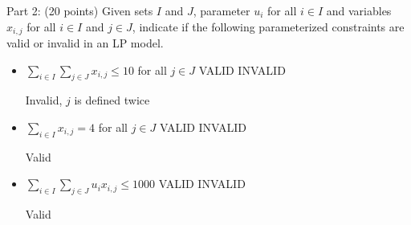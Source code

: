 \documentclass[letterpaper,oneside,12pt]{article}%
\newcommand{\blu}{\color{blue}}
\begin{document}
\vfill

Part 2: (20 points) Given sets $I$ and $J$, parameter $u_i$ for all $i \in I$ and variables $x_{i,j}$ for all $i \in I$ and $j \in J$, indicate if the following parameterized constraints are valid or invalid in an LP model.
\begin{itemize}
\item $ \sum\limits_{i \in I} \sum\limits_{j \in J} x_{i,j} \leq 10$ for all $j \in J$ \hfill VALID \hspace{1mm} INVALID \hspace{50mm} \phantom{a}

{\blu
Invalid, $j$ is defined twice
}

\item $ \sum\limits_{i \in I} x_{i,j} = 4$ for all $j \in J$ \hfill VALID \hspace{1mm} INVALID  \hspace{50mm} \phantom{a}

{\blu
Valid
}
\item $ \sum\limits_{i \in I} \sum\limits_{j \in J} u_i x_{i,j} \leq 1000$ \hfill VALID \hspace{1mm} INVALID  \hspace{50mm} \phantom{a}

{\blu
Valid
}

\end{itemize}
\end{document}
